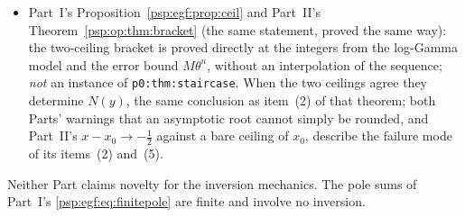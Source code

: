 \documentclass[11pt,letterpaper]{article}
\numberwithin{equation}{section}
\theoremstyle{remark}\newtheorem{remark}[theorem]{Remark}
\newcommand{\file}[1]{\nolinkurl{#1}}
\newcommand{\vol}{\mathrm{vol}}
\begin{document}
\begin{itemize}
\[
 f_\vol(t,E)=\sum_{k\ge2}\frac{(-1)^k(d_0+E)^kt^{k-1}}{k(k-1)}+\tfrac12\log\bigl(1+t(d_0+E)\bigr)+\sum_{j\ge1}\frac{B_{2j}t^{2j-1}}{2j(2j-1)(1+t(d_0+E))^{2j-1}} .
\]
Every term carries a factor $t$, and each coefficient of $t^m$ involves finitely many terms, so $f_\vol\in tR_\vol[[t,E]]$. Hence \file{p0:eq:core-master} holds with these data, and its triangular recurrence \file{p0:eq:core-triangular}, $e_m=-u^{-1}[t^m]f_\vol(t,E_{<m})$, is Part~II's \eqref{psp:op:eq:inverserecurrence}, because $[t^m]$ of $uE_{<m}$ vanishes; so $e_m=d_m$ for $m\ge1$. The theorem gives the formal series; the asymptotic statement \eqref{psp:op:eq:allinverse}, with its error $O(x_0^{-m-1}/\log x_0)$ and the location of the root, is Part~II's own. (Part~II's expansion of $H(x_0+d)-L$ into \eqref{psp:op:eq:formalF} was checked by the write: $(x_0+d)\log(1+td)=d+\sum_{k\ge2}(-1)^kd^kt^{k-1}/(k(k-1))$ with $t=1/x_0$.)
\item Part~I's Proposition~\ref{psp:egf:prop:ceil} and Part~II's Theorem~\ref{psp:op:thm:bracket} (the same statement, proved the same way): the two-ceiling bracket is proved directly at the integers from the log-Gamma model and the error bound $M\theta^n$, without an interpolation of the sequence; \emph{not} an instance of \file{p0:thm:staircase}. When the two ceilings agree they determine $N(y)$, the same conclusion as item~(2) of that theorem; both Parts' warnings that an asymptotic root cannot simply be rounded, and Part~II's $x-x_0\to-\frac12$ against a bare ceiling of $x_0$, describe the failure mode of its items~(2) and~(5).
\end{itemize}
Neither Part claims novelty for the inversion mechanics. The pole sums of Part~I's \eqref{psp:egf:eq:finitepole} are finite and involve no inversion.
\end{document}
